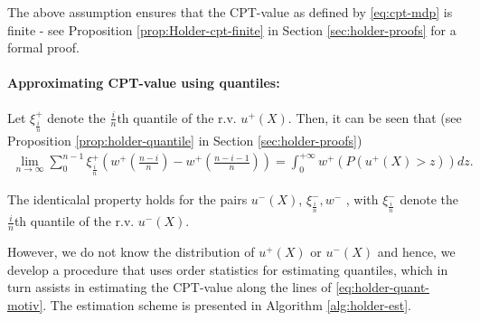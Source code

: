 \documentclass[11pt,letterpaper,english]{article}
\begin{document}
The above assumption ensures that the CPT-value as defined by \eqref{eq:cpt-mdp} is finite - see Proposition \ref{prop:Holder-cpt-finite} in Section \ref{sec:holder-proofs} for a formal proof.


\paragraph{Approximating CPT-value using quantiles:}
Let $\xi^+_{\frac{i}{n}}$ denote the $\frac{i}{n}$th quantile of the r.v. $u^+(X)$. Then, it can be seen that (see Proposition \ref{prop:holder-quantile} in Section \ref{sec:holder-proofs})
\begin{align}
\label{eq:holder-quant-motiv}
\lim_{n \rightarrow \infty} \sum_0^{n-1} \xi^+_{\frac{i}{n}} \left(w^+\left(\frac{n-i}{n}\right)- w^+\left(\frac{n-i-1}{n}\right) \right) = \int_0^{+\infty} w^+(P(u^+(X)>z)) dz.
\end{align}

The identicalal property holds for the pairs $u^-(X)$, $\xi^-_{\frac{i}{n}}, w^-$ , with $\xi^-_{\frac{i}{n}}$ denote the 
$\frac{i}{n}$th quantile of the r.v. $u^-(X)$.

However, we do not know the distribution of $u^+(X)$ or $u^-(X)$ and hence, we develop a procedure that uses order statistics for estimating quantiles, which in turn assists in estimating the CPT-value along the lines of \eqref{eq:holder-quant-motiv}. The estimation scheme is presented in Algorithm \ref{alg:holder-est}.
\end{document}
